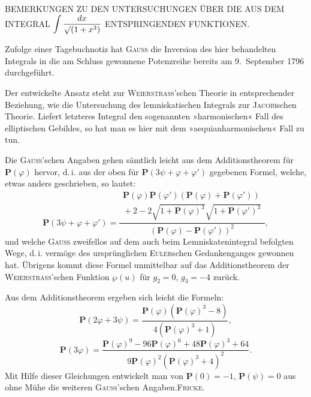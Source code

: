 %
\begin{center}
BEMERKUNGEN ZU DEN UNTERSUCHUNGEN ÜBER DIE AUS DEM INTEGRAL
$\displaystyle\int\frac{dx}{\mathord{\surd}(1+x^3)}$ ENTSPRINGENDEN FUNKTIONEN.
\end{center}

\noindent\hspace*{\parindent}Zufolge einer Tagebuchnotiz hat \textsc{Gauss} die Inversion des hier behandelten
Integrals in die am Schluss gewonnene Potenzreihe bereits am 9.\ September 1796 durchgeführt.

Der entwickelte Ansatz steht zur \textsc{Weierstrass}’schen Theorie in entsprechender
Beziehung, wie die Untersuchung des lemniskatischen Integrals zur \textsc{Jacobi}schen
Theorie. Liefert letzteres Integral den sogenannten »harmonischen« Fall des elliptischen
Gebildes, so hat man es hier mit dem »aequianharmonischen« Fall zu tun.

Die \textsc{Gauss}’schen Angaben gehen sämtlich leicht aus dem Additionstheorem
für $\boldsymbol{P}(\varphi)$ hervor, d.\,i. aus der oben für
$\boldsymbol{P}(3\psi+\varphi+\varphi')$ gegebenen Formel, welche, etwas anders geschrieben, so lautet:
\[
\boldsymbol{P}(3\psi+\varphi+\varphi')=
\frac{\begin{gathered}\boldsymbol{P}(\varphi)\boldsymbol{P}(\varphi')
(\boldsymbol{P}(\varphi)+\boldsymbol{P}(\varphi'))\\{}
+2-2\sqrt{1+\boldsymbol{P}(\varphi)^3}\sqrt{1+\boldsymbol{P}(\varphi')^3}\end{gathered}}
{(\boldsymbol{P}(\varphi)-\boldsymbol{P}(\varphi'))^2},
\]
\noindent und welche \textsc{Gauss} zweifellos auf dem auch beim Lemniskatenintegral befolgten
Wege, d.\,i. vermöge des ursprünglichen \textsc{Euler}schen Gedankenganges gewonnen hat.
Übrigens kommt diese Formel unmittelbar auf das Additionstheorem der
\textsc{Weierstrass}’schen Funktion $\wp(u)$ für $g_2=0$, $g_3=-4$ zurück.

Aus dem Additionstheorem ergeben sich leicht die Formeln:
\[
\boldsymbol{P}(2\varphi+3\psi)=\frac{\boldsymbol{P}(\varphi)(\boldsymbol{P}(\varphi)^3-8)}
{4(\boldsymbol{P}(\varphi)^3+1)},
\]
\[
\boldsymbol{P}(3\varphi)=\frac{\boldsymbol{P}(\varphi)^9-96\boldsymbol{P}(\varphi)^6+48\boldsymbol{P}(\varphi)^3+64}
{9\boldsymbol{P}(\varphi)^2(\boldsymbol{P}(\varphi)^3+4)^2}.
\]
\noindent Mit Hilfe dieser Gleichungen entwickelt man von $\boldsymbol{P}(0)=-1$,
$\boldsymbol{P}(\psi)=0$ aus ohne Mühe die weiteren \textsc{Gauss}’schen Angaben.\hfill\textsc{Fricke.}

